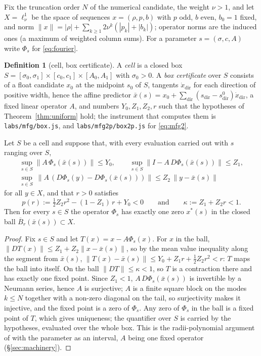 \documentclass[11pt]{article}
\theoremstyle{definition}
\newtheorem{definition}{Definition}
\newcommand{\lnu}{\ell^1_\nu}
\begin{document}
Fix the truncation order $N$ of the numerical candidate, the weight $\nu>1$, and let $X=\lnu$ be the space of sequences $x=(\rho,p,b)$ with $p$ odd, $b$ even, $b_0=1$ fixed, and norm $\|x\|=|\rho|+\sum_{k\ge1}2\nu^k(|p_k|+|b_k|)$; operator norms are the induced ones (a maximum of weighted column sums). For a parameter $s=(\sigma,c,A)$ write $\Phi_s$ for \eqref{eq:fourier}.

\begin{definition}[cell, box certificate]\label{def:cell}
A \emph{cell} is a closed box $S=[\sigma_0,\sigma_1]\times[c_0,c_1]\times[A_0,A_1]$ with $\sigma_0>0$. A \emph{box certificate} over $S$ consists of a float candidate $x_0$ at the midpoint $s_0$ of $S$, tangents $\dot x_{\mathrm{dir}}$ for each direction of positive width, hence the affine predictor $\bar x(s)=x_0+\sum_{\mathrm{dir}}(s_{\mathrm{dir}}-s^0_{\mathrm{dir}})\dot x_{\mathrm{dir}}$, a fixed linear operator $A$, and numbers $Y_0,Z_1,Z_2,r$ such that the hypotheses of Theorem~\ref{thm:uniform} hold; the instrument that computes them is \texttt{labs/mfg/box.js}, and \texttt{labs/mfg2p/box2p.js} for \eqref{eq:mfg2}.
\end{definition}

\begin{theorem}\label{thm:uniform}
Let $S$ be a cell and suppose that, with every evaluation carried out with $s$ ranging over $S$,
\begin{gather*}
\sup_{s\in S}\|A\,\Phi_s(\bar x(s))\|\le Y_0,\qquad \sup_{s\in S}\|I-A\,D\Phi_s(\bar x(s))\|\le Z_1,\\
\sup_{s\in S}\ \|A\,(D\Phi_s(y)-D\Phi_s(\bar x(s)))\|\le Z_2\,\|y-\bar x(s)\|
\end{gather*}
for all $y\in X$, and that $r>0$ satisfies
\[
p(r):=\tfrac12 Z_2 r^2-(1-Z_1)\,r+Y_0<0\qquad\text{and}\qquad \kappa:=Z_1+Z_2 r<1 .
\]
Then for every $s\in S$ the operator $\Phi_s$ has exactly one zero $x^*(s)$ in the closed ball $\overline{B}_r(\bar x(s))\subset X$.
\end{theorem}

\begin{proof}
Fix $s\in S$ and let $T(x)=x-A\Phi_s(x)$. For $x$ in the ball, $\|DT(x)\|\le Z_1+Z_2\|x-\bar x(s)\|$, so by the mean value inequality along the segment from $\bar x(s)$, $\|T(x)-\bar x(s)\|\le Y_0+Z_1 r+\tfrac12 Z_2 r^2<r$: $T$ maps the ball into itself. On the ball $\|DT\|\le\kappa<1$, so $T$ is a contraction there and has exactly one fixed point. Since $Z_1<1$, $A\,D\Phi_s(\bar x(s))$ is invertible by a Neumann series, hence $A$ is surjective; $A$ is a finite square block on the modes $k\le N$ together with a non-zero diagonal on the tail, so surjectivity makes it injective, and the fixed point is a zero of $\Phi_s$. Any zero of $\Phi_s$ in the ball is a fixed point of $T$, which gives uniqueness; the quantifier over $S$ is carried by the hypotheses, evaluated over the whole box. This is the radii-polynomial argument of \cite{DLM07,vdBL15} with the parameter as an interval, $A$ being one fixed operator (\S\ref{sec:machinery}).
\end{proof}
\end{document}
